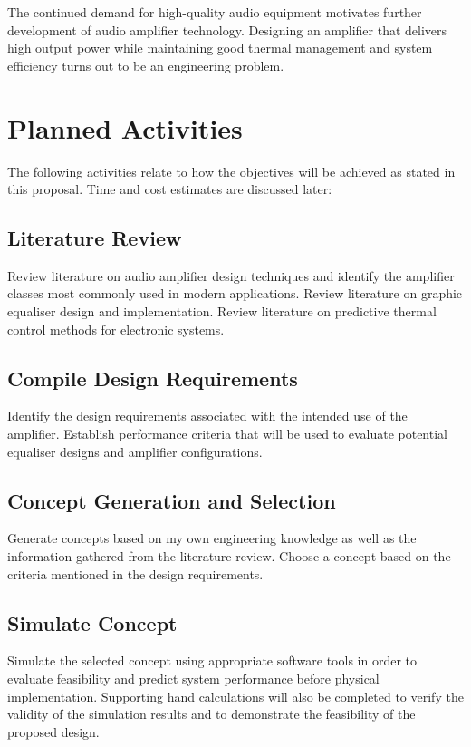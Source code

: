\documentclass[12pt,a4paper]{report}
\begin{document}
	The continued demand for high-quality audio equipment motivates further development of audio amplifier technology. Designing an amplifier that delivers high output power while maintaining good thermal management and system efficiency turns out to be an engineering problem.
	
	\section{Planned Activities}
	
	The following activities relate to how the objectives will be achieved as stated in this proposal. Time and cost estimates are discussed later:
	
	\subsection{Literature Review}

	Review literature on audio amplifier design techniques and identify the amplifier classes most commonly used in modern applications. Review literature on graphic equaliser design and implementation. Review literature on predictive thermal control methods for electronic systems.
	
	\subsection{Compile Design Requirements}
	
	Identify the design requirements associated with the intended use of the amplifier. Establish performance criteria that will be used to evaluate potential equaliser designs and amplifier configurations.
	
	\subsection{Concept Generation and Selection}
	
	Generate concepts based on my own engineering knowledge as well as the information gathered from the literature review. Choose a concept based on the criteria mentioned in the design requirements.
	
	\subsection{Simulate Concept}
	
	Simulate the selected concept using appropriate software tools in order to evaluate feasibility and predict system performance before physical implementation. Supporting hand calculations will also be completed to verify the validity of the simulation results and to demonstrate the feasibility of the proposed design.
	
\end{document}
